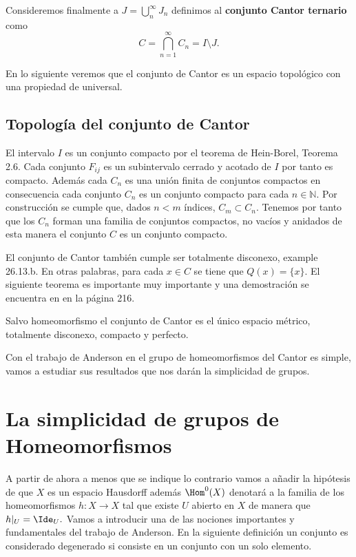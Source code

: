 Consideremos finalmente a $J=\bigcup_{n }^{\infty}  J_n$ definimos al \textbf{conjunto Cantor ternario} como $$C=\bigcap_{n=1}^\infty C_n=I \setminus J.$$ 

En lo siguiente veremos que el conjunto de Cantor es un espacio topológico con una propiedad de universal. 

\subsection*{Topología del conjunto de Cantor}

El intervalo $I$ es un conjunto compacto por el teorema de Hein-Borel, \cite{cal_Paez} Teorema 2.6. Cada conjunto $F_{ij}$ es un subintervalo cerrado y acotado de $I$ por tanto es compacto. Además cada $C_n$ es una unión finita de conjuntos compactos en consecuencia cada conjunto $C_n$ es un conjunto compacto para cada $n \in \mathbb{N}$. Por construcción se cumple que, dados $n < m $ índices, $C_m \subset C_n$. Tenemos por tanto que los $C_n$ forman una familia de conjuntos compactos, no vacíos y anidados de esta manera el conjunto $C$ es un conjunto compacto. 

 El conjunto de Cantor también cumple ser totalmente disconexo, \cite{top_willd} example 26.13.b. En otras palabras, para cada $x \in C$ se tiene que $Q(x)=\{x\}$. El siguiente teorema es importante muy importante y una demostración se encuentra en \cite{top_willd} en la página 216.

\begin{te}\label{te:Cantor_universal}
Salvo homeomorfismo el conjunto de Cantor es el único espacio métrico, totalmente disconexo, compacto y perfecto. 
\end{te}


Con el trabajo de Anderson en \cite{ander} el grupo de homeomorfismos del Cantor es simple, vamos a estudiar sus resultados que nos darán la simplicidad de grupos.  

\section*{La simplicidad de grupos de Homeomorfismos}

A partir de ahora a menos que se indique lo contrario vamos a añadir la hipótesis de que $X$ es un espacio Hausdorff además $\Hom^0(X)$ denotará a la familia de los homeomorfismos $h:X \to X$ tal que existe $U$ abierto en $X$ de manera que $h|_U=\Ide_U.$ Vamos a introducir una de las nociones importantes y fundamentales del trabajo de Anderson. En la siguiente definición un conjunto es considerado degenerado si consiste en un conjunto con un solo elemento.

